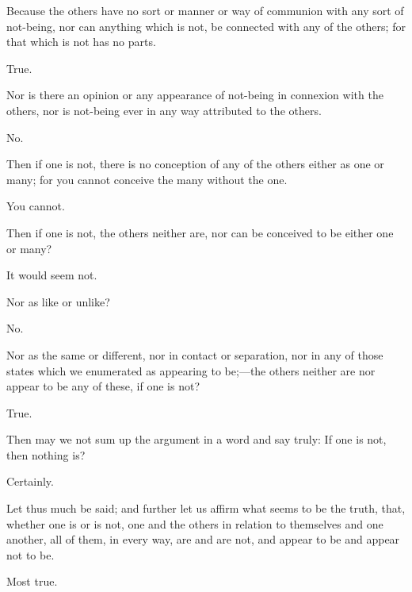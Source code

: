 \documentclass[11pt,letter]{article}
\begin{document}
\par  Because the others have no sort or manner or way of communion with any sort of not-being, nor can anything which is not, be connected with any of the others; for that which is not has no parts.

\par  True.

\par  Nor is there an opinion or any appearance of not-being in connexion with the others, nor is not-being ever in any way attributed to the others.

\par  No.

\par  Then if one is not, there is no conception of any of the others either as one or many; for you cannot conceive the many without the one.

\par  You cannot.

\par  Then if one is not, the others neither are, nor can be conceived to be either one or many?

\par  It would seem not.

\par  Nor as like or unlike?

\par  No.

\par  Nor as the same or different, nor in contact or separation, nor in any of those states which we enumerated as appearing to be;—the others neither are nor appear to be any of these, if one is not?

\par  True.

\par  Then may we not sum up the argument in a word and say truly: If one is not, then nothing is?

\par  Certainly.

\par  Let thus much be said; and further let us affirm what seems to be the truth, that, whether one is or is not, one and the others in relation to themselves and one another, all of them, in every way, are and are not, and appear to be and appear not to be.

\par  Most true.

\par 
 
\end{document}
